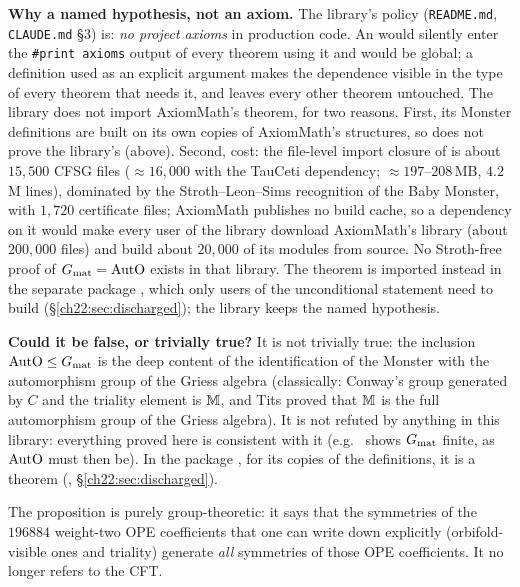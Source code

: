 \begin{dictionary}
\textbf{Why a named hypothesis, not an axiom.}  The library's policy (\texttt{README.md}, \texttt{CLAUDE.md} \S3) is:
\emph{no project axioms} in production code.  An  would silently enter the \texttt{\#print axioms} output of
every theorem using it and would be global; a definition  used as an explicit argument
 makes the dependence visible in the type of every theorem that needs it, and leaves every other
theorem untouched.  The library does not import AxiomMath's theorem, for two reasons.  First, its Monster definitions
are built on its own copies of AxiomMath's structures, so  does not prove the library's
 (above).  Second, cost: the file-level import closure of  is about $15{,}500$ CFSG
files ($\approx16{,}000$ with the TauCeti dependency; $\approx197$--$208$\,MB, $4.2$\,M lines), dominated by the
Stroth--Leon--Sims recognition of the Baby Monster, with $1{,}720$ certificate files; AxiomMath publishes no build cache, so
a dependency on it would make every user of the library download AxiomMath's library (about $200{,}000$ files) and build
about $20{,}000$ of its modules from source.  No Stroth-free proof of $G_{\mathrm{mat}}=\mathrm{AutO}$ exists in that
library.  The theorem is imported instead in the separate package , which only users of the
unconditional statement need to build (\S\ref{ch22:sec:discharged}); the library keeps the named hypothesis.

\textbf{Could it be false, or trivially true?}  It is not trivially true: the inclusion $\mathrm{AutO}\le G_{\mathrm{mat}}$
is the deep content of the identification of the Monster with the automorphism group of the Griess algebra (classically:
Conway's group generated by $C$ and the triality element is $\mathbb{M}$, and Tits proved that $\mathbb{M}$ is the full
automorphism group of the Griess algebra).  It is not refuted by anything in this library: everything proved here is
consistent with it (e.g.\  shows $G_{\mathrm{mat}}$ finite, as $\mathrm{AutO}$ must then be).  In the
package , for its copies of the definitions, it is a theorem (,
\S\ref{ch22:sec:discharged}).
\end{dictionary}

\begin{physics}
The proposition is purely group-theoretic: it says that the symmetries of the $196884$ weight-two OPE coefficients that one can
write down explicitly (orbifold-visible ones and triality) generate \emph{all} symmetries of those OPE coefficients.  It no
longer refers to the CFT.
\end{physics}

